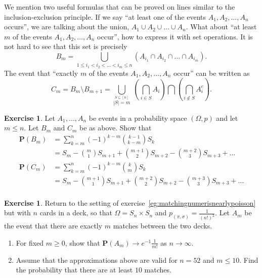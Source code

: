 \documentclass[preprint,  11pt]{amsart}
\theoremstyle{plain} %
\theoremstyle{definition} %
\newtheorem{exercise}[theorem]{Exercise}
\begin{document}
We mention two useful formulas that can be proved on lines similar to the inclusion-exclusion principle. If we say ``at least one of the events $A_{1}, A_{2},\ldots ,A_{n}$ occurs'', we are talking about the union, $A_{1}\cup A_{2}\cup \ldots \cup A_{n}$. What about ``at least $m$ of the events $A_{1}, A_{2},\ldots ,A_{n}$ occur'', how to express it with set operations. It is not hard to see that this set is precisely
$$
B_{m}=\bigcup_{ 1\le i_{1}<i_{2}<\ldots <i_{m}\le n} (A_{i_{1}}\cap A_{i_{2}}\cap \ldots \cap A_{i_{m}}).
$$
The event that ``exactly $m$ of the events $A_{1}, A_{2},\ldots ,A_{n}$ occur'' can be written as
$$
C_{m}=B_{m}\setminus B_{m+1} = \bigcup_{\stackrel{S\subseteq [n]}{|S|=m}} \; \left(\bigcap_{i\in S}A_{i}\right)\bigcap \left( \bigcap_{i\not\in S}A_{i}^{c}\right).
$$
\begin{exercise} Let $A_{1},\ldots ,A_{n}$ be events in a probability space $(\Omega,p)$ and let $m\le n$. Let $B_{m}$ and $C_{m}$ be as above. Show that 
\begin{align*}
\mathbf{P}(B_{m}) &= \sum_{k=m}^{n}(-1)^{k-m}\binom{k-1}{k-m}S_{k} \\
&= S_{m}-\binom{m}{1}S_{m+1}+\binom{m+1}{2}S_{m+2}-\binom{m+2}{3}S_{m+3}+\ldots  \\
\mathbf{P}(C_{m}) &= \sum_{k=m}^{n}(-1)^{k-m}\binom{k}{m}S_{k} \\
&= S_{m}-\binom{m+1}{1}S_{m+1}+\binom{m+2}{2}S_{m+2}-\binom{m+3}{3}S_{m+3}+\ldots  \\
\end{align*}
\end{exercise}

\begin{exercise} Return to the setting of exercise~\ref{eg:matchingnumerisnearlypoisson} but with $n$ cards in a deck, so that $\Omega=S_{n}\times S_{n}$ and $p_{(\pi,{\sigma})}=\frac{1}{(n!)^{2}}$. Let $A_{m}$ be the event that there are exactly $m$ matches between the two decks. 
\begin{enumerate}\setlength\itemsep{6pt}
\item For fixed $m\ge 0$, show that $\mathbf{P}(A_{m})\rightarrow e^{-1}\frac{1}{m!}$ as $n\rightarrow \infty$.
\item Assume that the approximations above are valid for $n=52$ and $m\le 10$. Find the probability that there are at least $10$ matches.
\end{enumerate}

\end{exercise}
\end{document}
